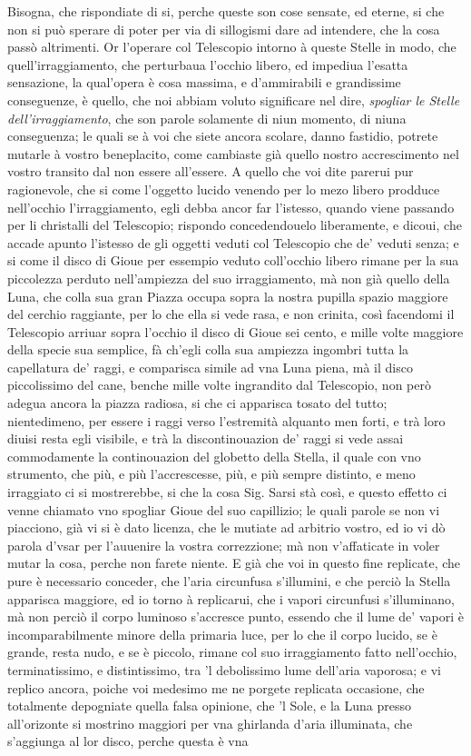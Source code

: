 \documentclass[11pt,twoside,openany]{book}
\begin{document}
Bisogna, che rispondiate di si, perche queste son cose sensate, ed eterne, si che non si può sperare di poter per via di sillogismi dare ad intendere, che la cosa passò altrimenti. Or l'operare col Telescopio intorno à queste Stelle in modo, che quell'irraggiamento, che perturbaua l'occhio libero, ed impediua l'esatta sensazione, la qual'opera è cosa massima, e d'ammirabili e grandissime conseguenze, è quello, che noi abbiam voluto significare nel dire, \textit{spogliar le Stelle dell'irraggiamento}, che son parole solamente di niun momento, di niuna conseguenza; le quali se à voi che siete ancora scolare, danno fastidio, potrete mutarle à vostro beneplacito, come cambiaste già quello nostro accrescimento nel vostro transito dal non essere all'essere. A quello che voi dite parerui pur ragionevole, che si come l'oggetto lucido venendo per lo mezo libero prodduce nell'occhio l'irraggiamento, egli debba ancor far l'istesso, quando viene passando per li christalli del Telescopio; rispondo concedendouelo liberamente, e dicoui, che accade apunto l'istesso de gli oggetti veduti col Telescopio che de' veduti senza; e si come il disco di Gioue per essempio veduto coll'occhio libero rimane per la sua piccolezza perduto nell'ampiezza del suo irraggiamento, mà non già quello della Luna, che colla sua gran Piazza occupa sopra la nostra pupilla spazio maggiore del cerchio raggiante, per lo che ella si vede rasa, e non crinita, così facendomi il Telescopio arriuar sopra l'occhio il disco di Gioue sei cento, e mille volte maggiore della specie sua semplice, fà ch'egli colla sua ampiezza ingombri tutta la capellatura de' raggi, e comparisca simile ad vna Luna piena, mà il disco piccolissimo del cane, benche mille volte ingrandito dal Telescopio, non però adegua ancora la piazza radiosa, si che ci apparisca tosato del tutto; nientedimeno, per essere i raggi verso l'estremità alquanto men forti, e trà loro diuisi resta egli visibile, e trà la discontinouazion de' raggi si vede assai commodamente la continouazion del globetto della Stella, il quale con vno strumento, che più, e più l'accrescesse, più, e più sempre distinto, e meno irraggiato ci si mostrerebbe, si che la cosa Sig. Sarsi stà così, e questo effetto ci venne chiamato vno spogliar Gioue del suo capillizio; le quali parole se non vi piacciono, già vi si è dato licenza, che le mutiate ad arbitrio vostro, ed io vi dò parola d'vsar per l'auuenire la vostra correzzione; mà non v'affaticate in voler mutar la cosa, perche non farete niente. E già che voi in questo fine replicate, che pure è necessario conceder, che l'aria circunfusa s'illumini, e che perciò la Stella apparisca maggiore, ed io torno à replicarui, che i vapori circunfusi s'illuminano, mà non perciò il corpo luminoso s'accresce punto, essendo che il lume de' vapori è incomparabilmente minore della primaria luce, per lo che il corpo lucido, se è grande, resta nudo, e se è piccolo, rimane col suo irraggiamento fatto nell'occhio, terminatissimo, e distintissimo, tra 'l debolissimo lume dell'aria vaporosa; e vi replico ancora, poiche voi medesimo me ne porgete replicata occasione, che totalmente depogniate quella falsa opinione, che 'l Sole, e la Luna presso all'orizonte si mostrino maggiori per vna ghirlanda d'aria illuminata, che s'aggiunga al lor disco, perche questa è vna 
\end{document}
